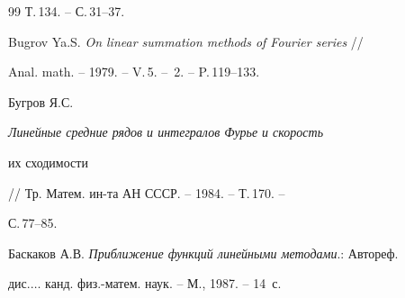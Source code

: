 \begin{thebibliography}{99}
Т.\,134. -- С.\,31--37.




Bugrov Ya.S. {\em On linear summation methods of Fourier series} //


Anal. math. -- 1979. -- V.\,5. -- \No\,2. -- P.\,119--133.




Бугров Я.С. {\em Линейные средние рядов и интегралов Фурье и скорость


их сходимости} // Тр. Матем. ин-та АН СССР. -- 1984. -- Т.\,170. --


С.\,77--85.




Баскаков А.В. {\em Приближение функций линейными методами}.: Автореф.


дис.\;$\dotsc$ канд. физ.-матем. наук. -- М., 1987. -- 14~с.








\end{thebibliography}





\vskip 2cm












\label{end}






